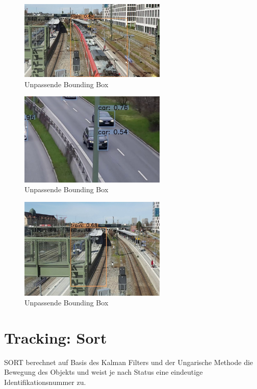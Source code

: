 \documentclass[conference]{IEEEtran}
\begin{document}
	\begin{figure}[!h]
		\begin{center}
			\includegraphics[width=7cm]{Media/Output_2126.jpg}
			\caption{Unpassende Bounding Box}
			\label{UB4}
		\end{center}
	\end{figure}
	\begin{figure}[!h]
		\begin{center}
			\includegraphics[width=7cm]{Media/Output_276 - Kopie.jpg}
			\caption{Unpassende Bounding Box}
			\label{UB2}
		\end{center}
	\end{figure}
	\begin{figure}[!h]
		\begin{center}
			\includegraphics[width=7cm]{Media/Output_564.jpg}
			\caption{Unpassende Bounding Box}
			\label{UB3}
		\end{center}
	\end{figure}
	\vspace{2cm}
	
	
	\section{Tracking: Sort}
	SORT \cite{sort} berechnet auf Basis des Kalman Filters \cite{kalman} und der Ungarische Methode \cite{hungarian} die Bewegung des Objekts und weist je nach Status eine eindeutige Identifikationsnummer zu. 
	
\end{document}
